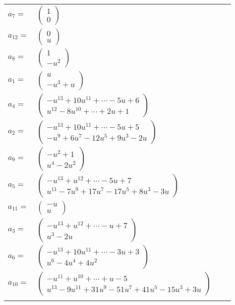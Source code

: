 \documentclass[1p]{elsarticle_modified}
\theoremstyle{definition}
\begin{document}
\begin{tabular}{m{7pt} m{180pt} m{7pt} m{180pt} }
\flushright $a_{7}=$&$\begin{pmatrix}1\\0\end{pmatrix}$ \\
\flushright $a_{12}=$&$\begin{pmatrix}0\\u\end{pmatrix}$ \\
\flushright $a_{8}=$&$\begin{pmatrix}1\\- u^2\end{pmatrix}$ \\
\flushright $a_{1}=$&$\begin{pmatrix}u\\- u^3+u\end{pmatrix}$ \\
\flushright $a_{4}=$&$\begin{pmatrix}- u^{13}+10 u^{11}+\cdots-5 u+6\\u^{12}-8 u^{10}+\cdots+2 u+1\end{pmatrix}$ \\
\flushright $a_{2}=$&$\begin{pmatrix}- u^{13}+10 u^{11}+\cdots-5 u+5\\- u^9+6 u^7-12 u^5+9 u^3-2 u\end{pmatrix}$ \\
\flushright $a_{9}=$&$\begin{pmatrix}- u^2+1\\u^4-2 u^2\end{pmatrix}$ \\
\flushright $a_{5}=$&$\begin{pmatrix}- u^{13}+u^{12}+\cdots-5 u+7\\u^{11}-7 u^9+17 u^7-17 u^5+8 u^3-3 u\end{pmatrix}$ \\
\flushright $a_{11}=$&$\begin{pmatrix}- u\\u\end{pmatrix}$ \\
\flushright $a_{3}=$&$\begin{pmatrix}- u^{13}+u^{12}+\cdots- u+7\\u^3-2 u\end{pmatrix}$ \\
\flushright $a_{6}=$&$\begin{pmatrix}- u^{13}+10 u^{11}+\cdots-3 u+3\\u^6-4 u^4+4 u^2\end{pmatrix}$ \\
\flushright $a_{10}=$&$\begin{pmatrix}- u^{11}+u^{10}+\cdots+u-5\\u^{13}-9 u^{11}+31 u^9-51 u^7+41 u^5-15 u^3+3 u\end{pmatrix}$\\&\end{tabular}
\end{document}
